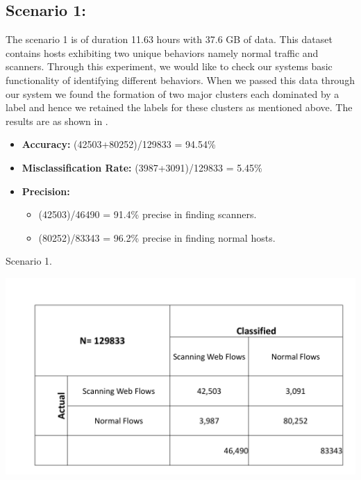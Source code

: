 \subsection{Scenario 1:}
The scenario 1 is of duration 11.63 hours with 37.6 GB of data. This dataset contains hosts exhibiting two unique behaviors namely normal traffic and scanners. Through this experiment, we would like to check our systems basic functionality of identifying different behaviors. When we passed this data through our system we found the formation of two major clusters each dominated by a label and hence we retained the labels for these clusters as mentioned above. The results are as shown in  . 



\begin{itemize}
	\item \textbf{Accuracy:} (42503+80252)/129833 = 94.54\%
	
	\item \textbf{Misclassification Rate:} (3987+3091)/129833 = 5.45\%
	\item \textbf{Precision:} 
	\begin{itemize}
		
				
		\item (42503)/46490 = 91.4\% precise in finding scanners.
		
		\item (80252)/83343 = 96.2\% precise in finding normal hosts.
			
	\end{itemize}

\end{itemize}
\begin{table}[t]
	\caption{Scenario 1.}%
	\centerline{\includegraphics[scale = 0.45]{scenario1.pdf}}	
\end{table}


